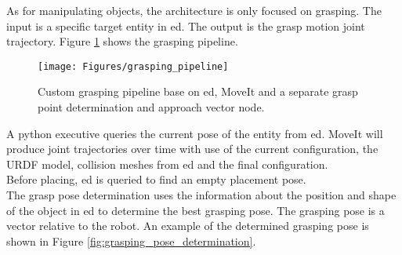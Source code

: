 As for manipulating objects, the architecture is only focused on grasping. The input is a specific target entity in \acrshort{ed}. The output is the grasp motion joint trajectory. Figure \ref{fig:grasping_pipeline} shows the grasping pipeline.
\begin{figure}[h]
    \centering
	\texttt{[image: Figures/grasping\_pipeline]}
	\caption{Custom grasping pipeline base on \acrshort{ed}, MoveIt and a separate grasp point determination and approach vector node.}
	\label{fig:grasping_pipeline}
\end{figure}
A python executive queries the current pose of the entity from \acrshort{ed}.
MoveIt will produce joint trajectories over time with use of the current configuration, the URDF model, collision meshes from \acrshort{ed} and the final configuration. 
\\
Before placing, \acrshort{ed} is queried to find an empty placement pose.
\\
The grasp pose determination uses the information about the position and shape of the object in \acrshort{ed} to determine the best grasping pose. The grasping pose is a vector relative to the robot. An example of the determined grasping pose is shown in Figure \ref{fig:grasping_pose_determination}.
